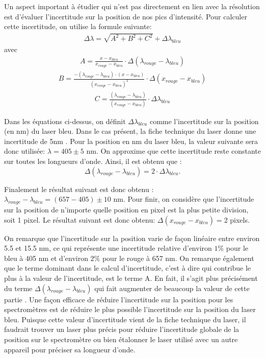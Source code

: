 \documentclass[11pt,letterpaper]{article}
\begin{document}
Un aspect important à étudier qui n'est pas directement en lien avec la résolution est d'évaluer l'incertitude sur 
la position de nos pics d'intensité. Pour calculer cette incertitude, on utilise la formule suivante: 
\begin{align}
  \Delta \lambda =\sqrt{A^{2}+B^{2}+C^{2}}+\Delta \lambda _{bleu}
\end{align}
avec 
\begin{align}
  A=\frac{x-x_{bleu}}{x_{rouge}-x_{bleu}}\cdot \Delta\left ( \lambda _{rouge}-\lambda _{bleu} \right )
\end{align}
\begin{align}
  B=\frac{-(\lambda _{rouge}-\lambda _{bleu})\cdot (x-x_{bleu})}{(x_{rouge}-x_{bleu})^{2}} \cdot \Delta \left ( x_{rouge}-x_{bleu} \right )
\end{align}
\begin{align}
  C=\frac{(\lambda _{rouge}-\lambda _{bleu})}{(x_{rouge}-x_{bleu})}\cdot \Delta \lambda _{bleu}
\end{align}

Dans les équations ci-dessus, on définit $\Delta \lambda _{bleu}$ comme l'incertitude sur la position (en nm)
du laser bleu. Dans le cas présent, la fiche technique du laser donne une incertitude de 5nm \cite{noauthor_compact_2024} . Pour la position en nm du laser bleu,
la valeur suivante sera donc utilisée: $ \lambda = 405\pm 5$ nm. On approxime que cette incertitude reste constante sur 
toutes les longueurs d'onde. Ainsi, il est obtenu que :
\begin{equation}
  \Delta\left ( \lambda _{rouge}-\lambda _{bleu} \right )=2\cdot \Delta \lambda _{bleu}. 
\end{equation}

Finalement le résultat suivant est donc obtenu : $\lambda _{rouge}-\lambda _{bleu}= (657-405)\pm 10$ nm.
Pour finir, on considère que l'incertitude sur la position de n'importe quelle position en pixel est la plus petite
division, soit 1 pixel. Le résultat suivant est donc obtenu: $\Delta \left ( x_{rouge}-x_{bleu} \right )=2$ pixels.

On remarque que l’incertitude sur la position varie de façon linéaire entre environ 5.5 et 15.5 nm, ce qui représente une
incertitude relative d'environ $1\%$ pour le bleu à 405 nm et d'environ $2\%$ pour le rouge à 657 nm. On remarque 
également que le terme dominant dans le calcul d'incertitude, 
c'est à dire qui contribue le plus à la valeur de l'incertitude, est le terme A. 
En fait, il s’agit plus précisément du terme $\Delta\left ( \lambda _{rouge}-\lambda _{bleu} \right )$ qui fait augmenter de beaucoup
la valeur de cette partie . Une façon efficace de réduire l'incertitude sur la position pour
les spectromètres est de réduire le plus possible l’incertitude sur la position du laser bleu. Puisque cette valeur d'incertitude
vient de la fiche technique du laser, il faudrait trouver un laser plus précis pour réduire l'incertitude 
globale de la position sur le spectromètre ou bien étalonner le laser utilisé avec un autre appareil pour préciser
sa longueur d'onde. 
\end{document}
